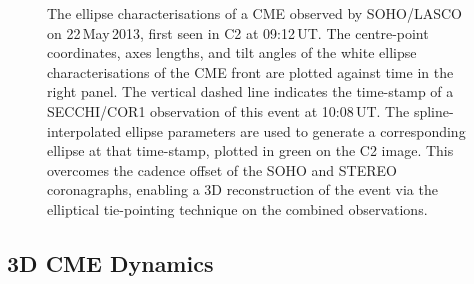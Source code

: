 \documentclass[preprint2]{aastex}
\begin{document}
\begin{figure}[t]
\caption{The ellipse characterisations of a CME observed by SOHO/LASCO on 22\,May\,2013, first seen in C2 at 09:12\,UT. The centre-point coordinates, axes lengths, and tilt angles of the white ellipse characterisations of the CME front are plotted against time in the right panel. The vertical dashed line indicates the time-stamp of a SECCHI/COR1 observation of this event at 10:08\,UT. The spline-interpolated ellipse parameters are used to generate a corresponding ellipse at that time-stamp, plotted in green on the C2 image. This overcomes the cadence offset of the SOHO and STEREO coronagraphs, enabling a 3D reconstruction of the event via the elliptical tie-pointing technique on the combined observations.}
\label{ellipse_params}
\end{figure}


\subsection{3D CME Dynamics}
\end{document}
